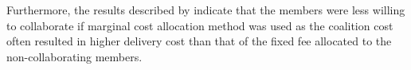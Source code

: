 Furthermore, the results described by \citet{bean2020behavioural} indicate that the members were less willing to collaborate if marginal cost allocation method was used as the coalition cost often resulted in higher delivery cost than that of the fixed fee allocated to the non-collaborating members.























